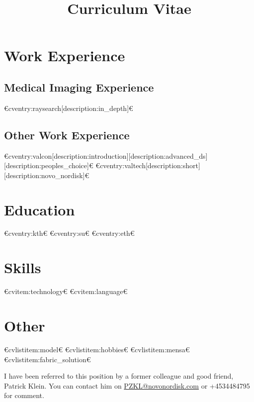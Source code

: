 
\title{Curriculum Vitae}



\newcommand{\role}{Data Scientist}
\newcommand{\company}{Novo Nordisk}



  \makecvtitle
  

  \section{Work Experience}
  \subsection{Medical Imaging Experience}
  €cventry:raysearch[description:in_depth]€
  \subsection{Other Work Experience}
  €cventry:valcon[description:introduction][description:advanced_ds][description:peoples_choice]€
  €cventry:valtech[description:short][description:novo_nordisk]€

  \section{Education}
  €cventry:kth€
  €cventry:su€
  €cventry:eth€

  \section{Skills}
  €cvitem:technology€
  €cvitem:language€

  \section{Other}
  €cvlistitem:model€
  €cvlistitem:hobbies€
  €cvlistitem:mensa€
  €cvlistitem:fabric_solution€

  \vspace{1cm}
  I have been referred to this position by a former colleague and good friend, Patrick Klein.
  You can contact him on \href{mailto:PZKL@novonordisk.com}{PZKL@novonordisk.com} or +4534484795 for comment.
  

